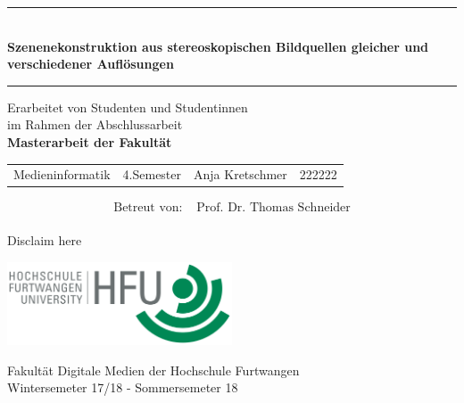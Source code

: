 \begin{titlepage}
\thispagestyle{empty}

\begin{center}
	\enlargethispage{3\baselineskip}
	\hrule
	
	\begin{center} \LARGE \textbf{\\Szenenekonstruktion aus stereoskopischen Bildquellen gleicher und verschiedener Auflösungen}
	\end{center}
	
	\vspace{0.5cm}
	
	\hrule
	
	\vspace{2.5cm}
	
	{\Large Erarbeitet von Studenten und Studentinnen\\im Rahmen der Abschlussarbeit\\[2ex]
	\textbf{Masterarbeit der Fakultät}}
	
	\vspace{3cm}
	
	\begin{tabular}{l l l l}
		Medieninformatik &4.Semester &Anja Kretschmer &222222 \vspace{0.2cm} \\	
	\end{tabular}
	
	\vspace{1cm}
	
	\begin{align*}
	\text{Betreut von: }  &\text{Prof. Dr. Thomas Schneider}\\
	\end{align*}	
	
	\vspace{1.0cm}
	
	Disclaim here
	
	\vspace{1.5cm}
	\includegraphics[width=0.5\textwidth]{./images/hfu_logo.png}

	Fakultät Digitale Medien der Hochschule Furtwangen\\[1ex]
	Wintersemeter 17/18 - Sommersemeter 18

\end{center}

\end{titlepage}